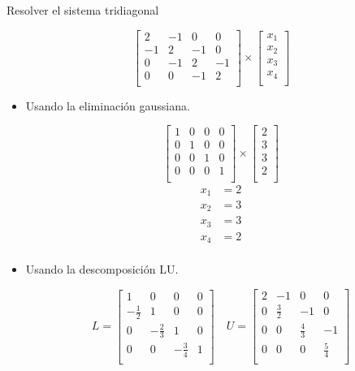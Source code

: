 Resolver el sistema tridiagonal

\[
    \begin{bmatrix}
        2 & -1 & 0 & 0 \\
        -1 & 2 & -1 & 0 \\
        0 & -1 & 2 & -1 \\
        0 & 0 & -1 & 2 \\
    \end{bmatrix}
    \times
    \begin{bmatrix}
        x_1 \\
        x_2 \\
        x_3 \\
        x_4 \\
    \end{bmatrix}
\]

\begin{itemize}
    \item Usando la eliminación gaussiana.

    \[
        \begin{bmatrix}
            1 & 0 & 0 & 0 \\
            0 & 1 & 0 & 0 \\
            0 & 0 & 1 & 0 \\
            0 & 0 & 0 & 1 \\
        \end{bmatrix}
        \times
        \begin{bmatrix}
            2 \\
            3 \\
            3 \\
            2 \\
        \end{bmatrix}
    \]
    \begin{align*}
        x_1 &= 2 \\
        x_2 &= 3 \\
        x_3 &= 3 \\
        x_4 &= 2 \\
    \end{align*}
    
    \item Usando la descomposición LU.
    
    \[
        L = \begin{bmatrix}
            1 & 0 & 0 & 0 \\
            -\frac{1}{2} & 1 & 0 & 0 \\
            0 & -\frac{2}{3} & 1 & 0 \\
            0 & 0 & -\frac{3}{4} & 1 \\
        \end{bmatrix}
        \quad
        U = \begin{bmatrix}
            2 & -1 & 0 & 0 \\
            0 & \frac{3}{2} & -1 & 0 \\
            0 & 0 & \frac{4}{3} & -1 \\
            0 & 0 & 0 & \frac{5}{4} \\
        \end{bmatrix}
    \]
    

\end{itemize}

